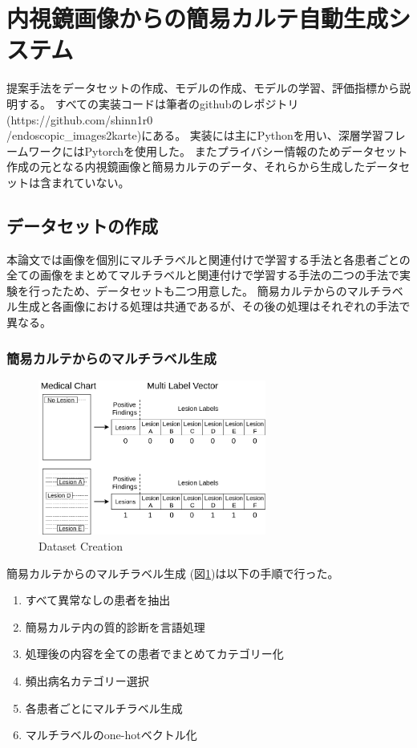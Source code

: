 \section{内視鏡画像からの簡易カルテ自動生成システム}

提案手法をデータセットの作成、モデルの作成、モデルの学習、評価指標から説明する。
すべての実装コードは筆者のgithubのレポジトリ (https://github.com/shinn1r0\\/endoscopic\_images2karte)にある。
実装には主にPythonを用い、深層学習フレームワークにはPytorchを使用した。
またプライバシー情報のためデータセット作成の元となる内視鏡画像と簡易カルテのデータ、それらから生成したデータセットは含まれていない。
\subsection{データセットの作成}
本論文では画像を個別にマルチラベルと関連付けで学習する手法と各患者ごとの全ての画像をまとめてマルチラベルと関連付けで学習する手法の二つの手法で実験を行ったため、データセットも二つ用意した。
簡易カルテからのマルチラベル生成と各画像における処理は共通であるが、その後の処理はそれぞれの手法で異なる。
\subsubsection{簡易カルテからのマルチラベル生成}

\begin{figure}[tb]
    \begin{center}
        \includegraphics[width=75mm]{./fig/ieice1.png}
        \caption{Dataset Creation}
        \label{fig:multilabel}
    \end{center}
\end{figure}

簡易カルテからのマルチラベル生成 (図\ref{fig:multilabel})は以下の手順で行った。

\begin{enumerate}
    \item すべて異常なしの患者を抽出
    \item 簡易カルテ内の質的診断を言語処理
    \item 処理後の内容を全ての患者でまとめてカテゴリー化
    \item 頻出病名カテゴリー選択
    \item 各患者ごとにマルチラベル生成
    \item マルチラベルのone-hotベクトル化
\end{enumerate}


